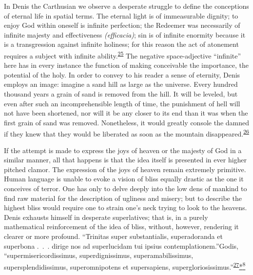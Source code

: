 In Denis the Carthusian we observe a desperate struggle to define the
conceptions of eternal life in spatial terms. The eternal light is of
immeasurable dignity; to enjoy God within oneself is infinite
perfection; the Redeemer was necessarily of infinite majesty and
effectiveness \emph{(efficacia)}; sin is of infinite enormity because it
is a transgression against infinite holiness; for this reason the act of
atonement requires a subject with infinite
ability.\textsuperscript{\protect\hypertarget{17_Chapter_Ten__THE_FAILURE_OF_IMAG.xhtmlux5cux23id_686}{\protect\hyperlink{23_NOTES.xhtmlux5cux23id_687}{25}}}
The negative space-adjective ``infinite'' here has in every instance the
function of making conceivable the importance, the potential of the
holy. In order to convey to his reader a sense of eternity, Denis
employs an image: imagine a sand hill as large as the universe. Every
hundred thousand years a grain of sand is removed from the hill. It will
be leveled, but even after such an incomprehensible length of time, the
punishment of hell will not have been shortened, nor will it be any
closer to its end than it was when the first grain of sand was removed.
Nonetheless, it would greatly console the damned if they knew that they
would be liberated as soon as the mountain
disappeared.\textsuperscript{\protect\hypertarget{17_Chapter_Ten__THE_FAILURE_OF_IMAG.xhtmlux5cux23id_684}{\protect\hyperlink{23_NOTES.xhtmlux5cux23id_685}{26}}}

If the attempt is made to express the joys of heaven or the majesty of
God in a similar manner, all that happens is that the idea itself is
presented in ever higher pitched clamor. The expression of the joys of
heaven remain extremely primitive. Human language is unable to evoke a
vision of bliss equally drastic as the one it conceives of terror. One
has only to delve deeply into the low dens of mankind to find raw
material for the description of ugliness and misery; but to describe the
highest bliss would require one to strain one's neck trying to look to
the heavens. Denis exhausts himself
\protect\hypertarget{17_Chapter_Ten__THE_FAILURE_OF_IMAG.xhtmlux5cux23page_257}{}{}in
desperate superlatives; that is, in a purely mathematical reinforcement
of the idea of bliss, without, however, rendering it clearer or more
profound. ``Trinitas super substantialis, superadoranda et superbona
.~.~. dirige nos ad superlucidam tui ipsius contemplationem.''Godis,
``supermisericordissimus, superdignissimus, superamabilissimus,
supersplendidissimus, superomnipotens et supersapiens,
supergloriosissimus.''\textsuperscript{\protect\hypertarget{17_Chapter_Ten__THE_FAILURE_OF_IMAG.xhtmlux5cux23id_682}{\protect\hyperlink{23_NOTES.xhtmlux5cux23id_683}{27}}}\protect\hypertarget{17_Chapter_Ten__THE_FAILURE_OF_IMAG.xhtmlux5cux23id_2593}{\protect\hyperlink{23_NOTES.xhtmlux5cux23id_2594}{*\textsuperscript{8}}}

